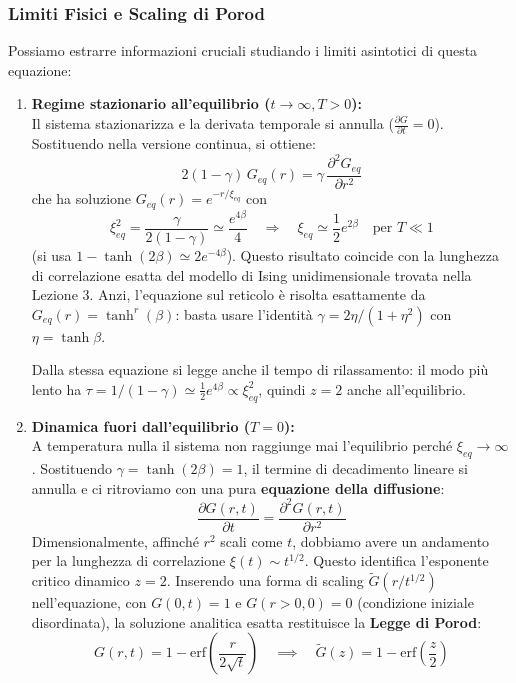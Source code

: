 \subsubsection{Limiti Fisici e Scaling di Porod}
Possiamo estrarre informazioni cruciali studiando i limiti asintotici di questa equazione:
\begin{enumerate}
    \item \textbf{Regime stazionario all'equilibrio ($t \to \infty, T > 0$):}\\
     Il sistema stazionarizza e la derivata temporale si annulla ($\frac{\partial G}{\partial t} = 0$). Sostituendo nella versione continua, si ottiene:
    \begin{equation}
        2(1 - \gamma)\, G_{eq}(r) = \gamma\, \frac{\partial^2 G_{eq}}{\partial r^2}
    \end{equation}
    che ha soluzione $G_{eq}(r) = e^{-r/\xi_{eq}}$ con
    \begin{equation}
        \xi_{eq}^2 = \frac{\gamma}{2(1 - \gamma)} \simeq \frac{e^{4\beta}}{4} \quad \Longrightarrow \quad \xi_{eq} \simeq \frac{1}{2} e^{2\beta} \quad \text{per } T \ll 1
    \end{equation}
    (si usa $1 - \tanh(2\beta) \simeq 2e^{-4\beta}$). Questo risultato coincide con la lunghezza di correlazione esatta del modello di Ising unidimensionale trovata nella Lezione 3. Anzi, l'equazione sul reticolo è risolta esattamente da $G_{eq}(r) = \tanh^r(\beta)$: basta usare l'identità $\gamma = 2\eta/(1+\eta^2)$ con $\eta = \tanh\beta$.

    Dalla stessa equazione si legge anche il tempo di rilassamento: il modo più lento ha $\tau = 1/(1-\gamma) \simeq \frac{1}{2}e^{4\beta} \propto \xi_{eq}^2$, quindi $z=2$ anche all'equilibrio.

    \item \textbf{Dinamica fuori dall'equilibrio ($T = 0$):}\\
    A temperatura nulla il sistema non raggiunge mai l'equilibrio perché $\xi_{eq} \to \infty$. Sostituendo $\gamma = \tanh(2\beta) = 1$, il termine di decadimento lineare si annulla e ci ritroviamo con una pura \textbf{equazione della diffusione}:
    \begin{equation}
        \frac{\partial G(r, t)}{\partial t} = \frac{\partial^2 G(r, t)}{\partial r^2}
    \end{equation}
    Dimensionalmente, affinché $r^2$ scali come $t$, dobbiamo avere un andamento per la lunghezza di correlazione $\xi(t) \sim t^{1/2}$. Questo identifica l'esponente critico dinamico $z = 2$. Inserendo una forma di scaling $\tilde{G}(r / t^{1/2})$ nell'equazione, con $G(0,t)=1$ e $G(r>0, 0) = 0$ (condizione iniziale disordinata), la soluzione analitica esatta restituisce la \textbf{Legge di Porod}:
    \begin{equation}
        G(r, t) = 1 - \text{erf}\left( \frac{r}{2\sqrt{t}} \right) \quad \implies \quad \tilde{G}(z) = 1 - \text{erf}\left(\frac{z}{2}\right)
    \end{equation}
    

\end{enumerate}
